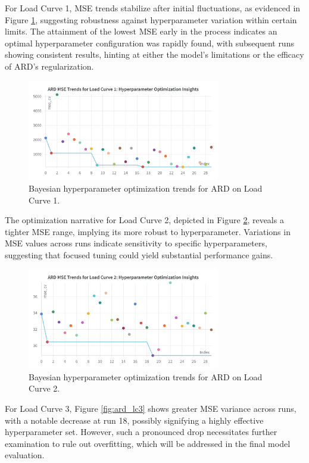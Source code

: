 \documentclass{article} %
\begin{document}
For Load Curve 1, \gls{MSE} trends stabilize after initial fluctuations, as evidenced in Figure \ref{fig:ard_lc1}, suggesting robustness against hyperparameter variation within certain limits. The attainment of the lowest MSE early in the process indicates an optimal hyperparameter configuration was rapidly found, with subsequent runs showing consistent results, hinting at either the model's limitations or the efficacy of ARD's regularization.
\begin{figure}[H]
    \centering
    \includegraphics[width=0.75\textwidth]{ressources/Hyperparams/ard/ARD MSE Trends for Load Curve 1 Hyperparameter Optimization Insights.png}
    \caption{Bayesian hyperparameter optimization trends for ARD on Load Curve 1.}
    \label{fig:ard_lc1}
\end{figure}
The optimization narrative for Load Curve 2, depicted in Figure \ref{fig:ard_lc2}, reveals a tighter \gls{MSE} range, implying its more robust to hyperparameter. Variations in \gls{MSE} values across runs indicate sensitivity to specific hyperparameters, suggesting that focused tuning could yield substantial performance gains.
\begin{figure}[H]
    \centering
    \includegraphics[width=0.75\textwidth]{ressources/Hyperparams/ard/ARD MSE Trends for Load Curve 2 Hyperparameter Optimization Insights.png}
    \caption{Bayesian hyperparameter optimization trends for ARD on Load Curve 2.}
    \label{fig:ard_lc2}
\end{figure}
For Load Curve 3, Figure \ref{fig:ard_lc3} shows greater \gls{MSE} variance across runs, with a notable decrease at run 18, possibly signifying a highly effective hyperparameter set. However, such a pronounced drop necessitates further examination to rule out overfitting, which will be addressed in the final model evaluation.
\end{document}
